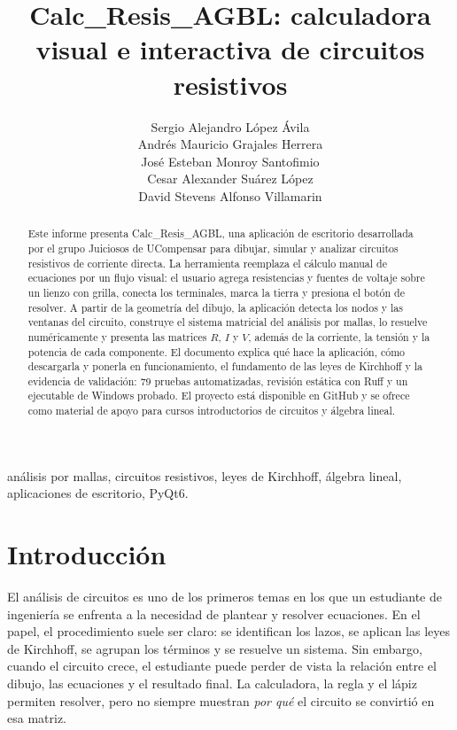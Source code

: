 \documentclass[journal]{IEEEtran}
\title{Calc\_Resis\_AGBL: calculadora visual e interactiva de circuitos resistivos}
\author{
Sergio Alejandro L\'opez \'Avila\\
Andr\'es Mauricio Grajales Herrera\\
Jos\'e Esteban Monroy Santofimio\\
Cesar Alexander Su\'arez L\'opez\\
David Stevens Alfonso Villamarin
}
\begin{document}
\maketitle

\begin{abstract}
Este informe presenta Calc\_Resis\_AGBL, una aplicación de escritorio desarrollada por el grupo Juiciosos de UCompensar para dibujar, simular y analizar circuitos resistivos de corriente directa. La herramienta reemplaza el cálculo manual de ecuaciones por un flujo visual: el usuario agrega resistencias y fuentes de voltaje sobre un lienzo con grilla, conecta los terminales, marca la tierra y presiona el botón de resolver. A partir de la geometría del dibujo, la aplicación detecta los nodos y las ventanas del circuito, construye el sistema matricial del análisis por mallas, lo resuelve numéricamente y presenta las matrices $R$, $I$ y $V$, además de la corriente, la tensión y la potencia de cada componente. El documento explica qué hace la aplicación, cómo descargarla y ponerla en funcionamiento, el fundamento de las leyes de Kirchhoff y la evidencia de validación: 79 pruebas automatizadas, revisión estática con Ruff y un ejecutable de Windows probado. El proyecto está disponible en GitHub y se ofrece como material de apoyo para cursos introductorios de circuitos y álgebra lineal.
\end{abstract}

\begin{IEEEkeywords}
análisis por mallas, circuitos resistivos, leyes de Kirchhoff, álgebra lineal, aplicaciones de escritorio, PyQt6.
\end{IEEEkeywords}

\section{Introducción}

El análisis de circuitos es uno de los primeros temas en los que un estudiante de ingeniería se enfrenta a la necesidad de plantear y resolver ecuaciones. En el papel, el procedimiento suele ser claro: se identifican los lazos, se aplican las leyes de Kirchhoff, se agrupan los términos y se resuelve un sistema. Sin embargo, cuando el circuito crece, el estudiante puede perder de vista la relación entre el dibujo, las ecuaciones y el resultado final. La calculadora, la regla y el lápiz permiten resolver, pero no siempre muestran \emph{por qué} el circuito se convirtió en esa matriz.
\end{document}
